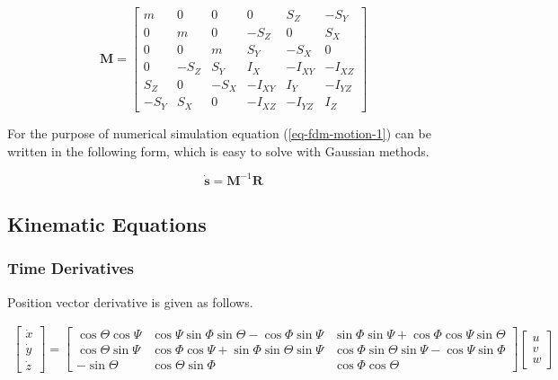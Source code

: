 \begin{equation}
 \boldsymbol M
 =
  \left[
    \begin{matrix}
         m &    0 &    0 &    0    &     S_Z &    -S_Y \\
         0 &    m &    0 & -S_Z    &       0 &     S_X \\
         0 &    0 &    m &  S_Y    &    -S_X &       0 \\
         0 & -S_Z &  S_Y &  I_X    & -I_{XY} & -I_{XZ} \\
       S_Z &    0 & -S_X & -I_{XY} &  I_Y    & -I_{YZ} \\
      -S_Y &  S_X &    0 & -I_{XZ} & -I_{YZ} &  I_Z
    \end{matrix}
  \right]
\end{equation}

For the purpose of numerical simulation equation (\ref{eq-fdm-motion-1}) can be written in the following form, which is easy to solve with Gaussian methods.

\begin{equation}
  \label{eq-fdm-motion-2}
  \dot {\boldsymbol s} = {\boldsymbol M}^{-1} \boldsymbol R
\end{equation}

\subsection{Kinematic Equations}

\subsubsection{Time Derivatives}

Position vector derivative is given as follows. \cite{Allerton2009}

\begin{gather}
  \label{eq-fdm-position-deriv}
  \left[
    \begin{matrix}
      \dot x \\
      \dot y \\
      \dot z
    \end{matrix}
  \right]
  =
    \left[
    \begin{matrix}
       \cos \Theta \cos \Psi &
       \cos \Psi   \sin \Phi   \sin \Theta - \cos \Phi   \sin \Psi &
       \sin \Phi   \sin \Psi + \cos \Phi     \cos \Psi   \sin \Theta \\
       \cos \Theta \sin \Psi &
       \cos \Phi   \cos \Psi + \sin \Phi     \sin \Theta \sin \Psi &
       \cos \Phi   \sin \Theta \sin \Psi -   \cos \Psi   \sin \Phi \\
      -\sin \Theta &
       \cos \Theta \sin \Phi &
       \cos \Phi   \cos \Theta
    \end{matrix}
  \right]
  \left[
    \begin{matrix}
      u \\
      v \\
      w
    \end{matrix}
  \right]
\end{gather}

